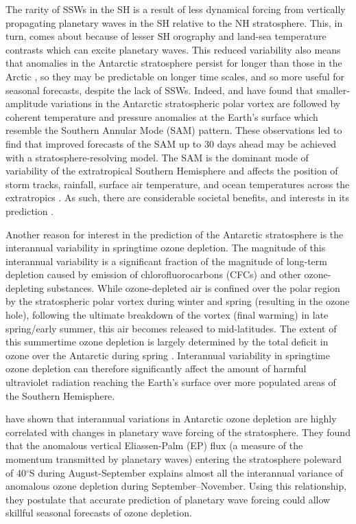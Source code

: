 The rarity of SSWs in the SH is a result of less dynamical forcing from
vertically propagating planetary waves in the SH relative to the NH
stratosphere. This, in turn, comes about because of lesser SH orography and
land-sea temperature contrasts which can excite planetary waves. This reduced
variability also means that anomalies in the Antarctic stratosphere persist for
longer than those in the Arctic \citep{Simpson2011}, so they may be predictable
on longer time scales, and so more useful for seasonal forecasts, despite the
lack of SSWs. Indeed, \citet{Thompson2005} and \citet{Son2013a} have found that
smaller-amplitude variations in the Antarctic stratospheric polar vortex are
followed by coherent temperature and pressure anomalies at the Earth's surface
which resemble the Southern Annular Mode (SAM) pattern. These observations led
\citet{Roff2011} to find that improved forecasts of the SAM up to 30 days ahead
may be achieved with a stratosphere-resolving model. The SAM is the dominant
mode of variability of the extratropical Southern Hemisphere and affects the
position of storm tracks, rainfall, surface air temperature, and ocean
temperatures across the extratropics \citep[e.g.,][]{Silvestri2003, Reason2005,
Hendon2007}. As such, there are considerable societal benefits, and interests in
its prediction \citep{Lim2013}.

Another reason for interest in the prediction of the Antarctic stratosphere is
the interannual variability in springtime ozone depletion. The magnitude of this
interannual variability is a significant fraction of the magnitude of long-term
depletion caused by emission of chlorofluorocarbons (CFCs) and other
ozone-depleting substances. While ozone-depleted air is confined over the polar
region by the stratospheric polar vortex during winter and spring (resulting in
the ozone hole), following the ultimate breakdown of the vortex (final warming)
in late spring/early summer, this air becomes released to mid-latitudes. The
extent of this summertime ozone depletion is largely determined by the total
deficit in ozone over the Antarctic during spring
\citep{Bodeker2005}. Interannual variability in springtime ozone depletion can
therefore significantly affect the amount of harmful ultraviolet radiation
reaching the Earth's surface over more populated areas of the Southern
Hemisphere.

\citet{Salby2012} have shown that interannual variations in Antarctic ozone
depletion are highly correlated with changes in planetary wave forcing of the
stratosphere. They found that the anomalous vertical Eliassen-Palm (EP) flux (a
measure of the momentum transmitted by planetary waves) entering the
stratosphere poleward of 40$^{\circ}$S during August-September explains almost
all the interannual variance of anomalous ozone depletion during
September--November. Using this relationship, they postulate that accurate
prediction of planetary wave forcing could allow skillful seasonal forecasts of
ozone depletion.

